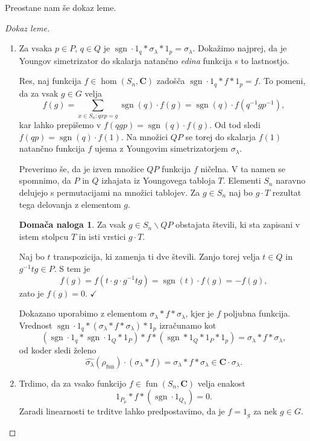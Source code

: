 \documentclass[11pt]{book}
\def\CC{\mathbf{C}}
\def\youngsym{\sigma_{\lambda}}
\DeclareMathOperator\sgn{sgn}
\DeclareMathOperator\fun{fun}
\def\kljuka{$\checkmark$}
\theoremstyle{definition}
\theoremstyle{zgled}
\theoremstyle{odprtproblem}
\theoremstyle{domacanaloga}
\newtheorem*{domacanaloga}{Domača naloga}
\newenvironment{dokaz}
    {\color{siva}\begin{proof}}
    {\end{proof}}
\theoremstyle{izrek}
\begin{document}
Preostane nam še dokaz leme.

\begin{dokaz}[Dokaz leme] \leavevmode
\begin{enumerate}
    \item Za vsaka $p \in P$, $q \in Q$ je $\sgn \cdot 1_q * \youngsym * 1_p = \youngsym$. Dokažimo najprej, da je Youngov simetrizator do skalarja natančno \emph{edina} funkcija s to lastnostjo. 
    
    Res, naj funkcija $f \in \hom(S_n, \CC)$ zadošča $\sgn \cdot 1_q * f * 1_p = f$. To pomeni, da za vsak $g \in G$ velja
    \[
        f(g) = \sum_{x \in S_n \colon q x p = g} \sgn(q) \cdot f(g) = \sgn(q) \cdot f(q^{-1} g p^{-1}),
    \]
    kar lahko prepišemo v $f(qgp) = \sgn(q) \cdot f(g)$. Od tod sledi $f(qp) = \sgn(q) \cdot f(1)$. Na množici $QP$ se torej do skalarja $f(1)$ natančno funkcija $f$ ujema z Youngovim simetrizatorjem $\youngsym$. 
    
    Preverimo še, da je izven množice $QP$ funkcija $f$ ničelna. V ta namen se spomnimo, da $P$ in $Q$ izhajata iz Youngovega tabloja $T$. Elementi $S_n$ naravno delujejo s permutacijami na množici tablojev. Za $g \in S_n$ naj bo $g \cdot T$ rezultat tega delovanja z elementom $g$.

    \begin{domacanaloga}
    Za vsak $g \in S_n \backslash QP$ obstajata števili, ki sta zapisani v istem stolpcu $T$ in isti vrstici $g \cdot T$.
    \end{domacanaloga}

    Naj bo $t$ transpozicija, ki zamenja ti dve števili. Zanjo torej velja $t \in Q$ in $g^{-1} t g \in P$. S tem je
    \[
        f(g) = f(t \cdot g \cdot g^{-1} t g) = \sgn(t) \cdot f(g) = - f(g),
    \]
    zato je $f(g) = 0$. \kljuka

    Dokazano uporabimo z elementom $\youngsym * f * \youngsym$, kjer je $f$ poljubna funkcija. Vrednost $\sgn \cdot 1_q * (\youngsym * f * \youngsym) * 1_p$ izračunamo kot
    \[
        (\sgn \cdot 1_q * \sgn \cdot 1_Q * 1_P) * f * (\sgn * 1_Q * 1_P * 1_p) =
        \youngsym * f * \youngsym,
    \]
    od koder sledi želeno
    \[
        \widehat{\youngsym}(\rho_{\fun}) \cdot (\youngsym * f) = \youngsym * f * \youngsym \in \CC \cdot \youngsym.
    \]

    \item Trdimo, da za vsako funkcijo $f \in \fun(S_n, \CC)$ velja enakost
    \[    
        1_{P_\mu} * f * (\sgn \cdot 1_{Q_{\lambda}}) = 0.
    \]
    Zaradi linearnosti te trditve lahko predpostavimo, da je $f = 1_g$ za nek $g \in G$. 
    

\end{enumerate}
\end{dokaz}
\end{document}
